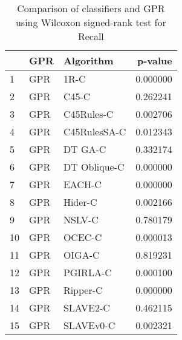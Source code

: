 \begin{table}
\footnotesize
\caption{Comparison of classifiers and GPR using Wilcoxon signed-rank test for Recall}
\label{tab:GPR wilcoxon Recall comparison}
\begin{tabular}{lllr}
\hline
 & GPR & Algorithm & p-value \\
\hline
1 & GPR & 1R-C & 0.000000 \\
2 & GPR & C45-C & 0.262241 \\
3 & GPR & C45Rules-C & 0.002706 \\
4 & GPR & C45RulesSA-C & 0.012343 \\
5 & GPR & DT GA-C & 0.332174 \\
6 & GPR & DT Oblique-C & 0.000000 \\
7 & GPR & EACH-C & 0.000000 \\
8 & GPR & Hider-C & 0.002166 \\
9 & GPR & NSLV-C & 0.780179 \\
10 & GPR & OCEC-C & 0.000013 \\
11 & GPR & OIGA-C & 0.819231 \\
12 & GPR & PGIRLA-C & 0.000100 \\
13 & GPR & Ripper-C & 0.000000 \\
14 & GPR & SLAVE2-C & 0.462115 \\
15 & GPR & SLAVEv0-C & 0.002321 \\
\hline
\end{tabular}
\end{table}
